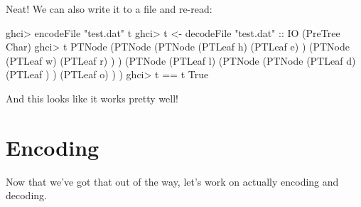 \documentclass[]{article}
\newenvironment{Shaded}{}{}
\newcommand{\CharTok}[1]{\textcolor[rgb]{0.25,0.44,0.63}{#1}}
\newcommand{\DataTypeTok}[1]{\textcolor[rgb]{0.56,0.13,0.00}{#1}}
\newcommand{\NormalTok}[1]{#1}
\newcommand{\OperatorTok}[1]{\textcolor[rgb]{0.40,0.40,0.40}{#1}}
\newcommand{\OtherTok}[1]{\textcolor[rgb]{0.00,0.44,0.13}{#1}}
\newcommand{\StringTok}[1]{\textcolor[rgb]{0.25,0.44,0.63}{#1}}
\begin{document}
Neat! We can also write it to a file and re-read:

\begin{Shaded}
\begin{Highlighting}[]
\NormalTok{ghci}\OperatorTok{\textgreater{}}\NormalTok{ encodeFile }\StringTok{"test.dat"}\NormalTok{ t}
\NormalTok{ghci}\OperatorTok{\textgreater{}}\NormalTok{ t\textquotesingle{} }\OtherTok{\textless{}{-}}\NormalTok{ decodeFile }\StringTok{"test.dat"}\OtherTok{ ::} \DataTypeTok{IO}\NormalTok{ (}\DataTypeTok{PreTree} \DataTypeTok{Char}\NormalTok{)}
\NormalTok{ghci}\OperatorTok{\textgreater{}}\NormalTok{ t\textquotesingle{}}
\DataTypeTok{PTNode}\NormalTok{ (}\DataTypeTok{PTNode}\NormalTok{ (}\DataTypeTok{PTNode}\NormalTok{ (}\DataTypeTok{PTLeaf} \CharTok{\textquotesingle{}h\textquotesingle{}}\NormalTok{)}
\NormalTok{                       (}\DataTypeTok{PTLeaf} \CharTok{\textquotesingle{}e\textquotesingle{}}\NormalTok{)}
\NormalTok{               )}
\NormalTok{               (}\DataTypeTok{PTNode}\NormalTok{ (}\DataTypeTok{PTLeaf} \CharTok{\textquotesingle{}w\textquotesingle{}}\NormalTok{)}
\NormalTok{                       (}\DataTypeTok{PTLeaf} \CharTok{\textquotesingle{}r\textquotesingle{}}\NormalTok{)}
\NormalTok{               )}
\NormalTok{       )}
\NormalTok{       (}\DataTypeTok{PTNode}\NormalTok{ (}\DataTypeTok{PTLeaf} \CharTok{\textquotesingle{}l\textquotesingle{}}\NormalTok{)}
\NormalTok{               (}\DataTypeTok{PTNode}\NormalTok{ (}\DataTypeTok{PTNode}\NormalTok{ (}\DataTypeTok{PTLeaf} \CharTok{\textquotesingle{}d\textquotesingle{}}\NormalTok{)}
\NormalTok{                               (}\DataTypeTok{PTLeaf} \CharTok{\textquotesingle{} \textquotesingle{}}\NormalTok{)}
\NormalTok{                       )}
\NormalTok{                       (}\DataTypeTok{PTLeaf} \CharTok{\textquotesingle{}o\textquotesingle{}}\NormalTok{)}
\NormalTok{               )}
\NormalTok{       )}
\NormalTok{ghci}\OperatorTok{\textgreater{}}\NormalTok{ t\textquotesingle{} }\OperatorTok{==}\NormalTok{ t}
\DataTypeTok{True}
\end{Highlighting}
\end{Shaded}

And this looks like it works pretty well!

\section{Encoding}\label{encoding}

Now that we've got that out of the way, let's work on actually encoding and
decoding.
\end{document}
